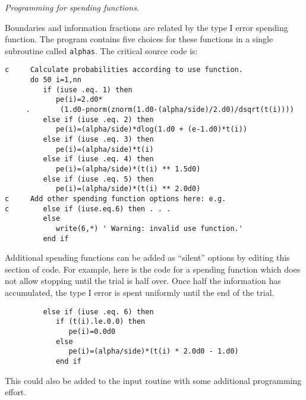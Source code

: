 \vspace*{2em}
\noindent
{\em Programming for spending functions.}

Boundaries and information fractions are related by the type I error
spending function.  The program contains five choices for these functions
in a single subroutine called {\tt alphas}.  The critical source code is:
{\singlespace \begin{verbatim}
c     Calculate probabilities according to use function.
      do 50 i=1,nn
         if (iuse .eq. 1) then
            pe(i)=2.d0*
     .       (1.d0-pnorm(znorm(1.d0-(alpha/side)/2.d0)/dsqrt(t(i))))
         else if (iuse .eq. 2) then
            pe(i)=(alpha/side)*dlog(1.d0 + (e-1.d0)*t(i))
         else if (iuse .eq. 3) then
            pe(i)=(alpha/side)*t(i)
         else if (iuse .eq. 4) then
            pe(i)=(alpha/side)*(t(i) ** 1.5d0)
         else if (iuse .eq. 5) then
            pe(i)=(alpha/side)*(t(i) ** 2.0d0)
c     Add other spending function options here: e.g.
c        else if (iuse.eq.6) then . . .
         else
            write(6,*) ' Warning: invalid use function.'
         end if
\end{verbatim}}

Additional spending functions can be added as ``silent'' options by editing
this section of code.  For example, here is the code for a spending
function which does not allow stopping until the trial is half over.  Once
half the information has accumulated, the type I error is spent uniformly
until the end of the trial.
{\singlespace \begin{verbatim}
         else if (iuse .eq. 6) then
            if (t(i).le.0.0) then
               pe(i)=0.0d0
            else
               pe(i)=(alpha/side)*(t(i) * 2.0d0 - 1.d0)
            end if
\end{verbatim}}
This could also be added to the input routine with some additional
programming effort.


